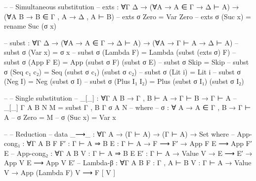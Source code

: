 \documentclass{article}
\begin{document}
\begin{prev}
\begin{code}
-- -- Simultaneous substitution
-- exts : ∀{Γ Δ} → (∀{A} → A ∈ Γ → Δ ⊢ A) → (∀{A B} → B ∈ Γ , A → Δ , A ⊢ B)
-- exts σ Zero = Var Zero
-- exts σ (Suc x) = rename Suc (σ x)

-- subst : ∀{Γ Δ} → (∀{A} → A ∈ Γ → Δ ⊢ A) → (∀{A} → Γ ⊢ A → Δ ⊢ A)
-- subst σ (Var x) = σ x
-- subst σ (Lambda F) = Lambda (subst (exts σ) F)
-- subst σ (App F E) = App (subst σ F) (subst σ E)
-- subst σ Skip = Skip
-- subst σ (Seq c₁ c₂) = Seq (subst σ c₁) (subst σ c₂)
-- subst σ (Lit i) = Lit i
-- subst σ (Neg I) = Neg (subst σ I)
-- subst σ (Plus I₁ I₂) = Plus (subst σ I₁) (subst σ I₂)

-- -- Single substitution
-- _[_] : ∀{Γ A B} → Γ , B ⊢ A → Γ ⊢ B → Γ ⊢ A
-- _[_] {Γ} {A} {B} N M = subst {Γ , B} {Γ} σ {A} N
--     where
--     σ : ∀ {A} → A ∈ Γ , B → Γ ⊢ A
--     σ Zero = M
--     σ (Suc x) = Var x

-- -- Reduction
-- data _⟶_ : ∀{Γ A} → (Γ ⊢ A) → (Γ ⊢ A) → Set where
--     App-cong₁ : ∀{Γ A B} {F F′ : Γ ⊢ A ⇒ B} {E : Γ ⊢ A} → F ⟶ F′ → App F E ⟶ App F′ E
--     App-cong₂ : ∀{Γ A B} {V : Γ ⊢ A ⇒ B} {E E′ : Γ ⊢ A} → Value V → E ⟶ E′ → App V E ⟶ App V E′
--     Lambda-β : ∀{Γ A B} {F : Γ , A ⊢ B} {V : Γ ⊢ A} → Value V → App (Lambda F) V ⟶ F [ V ]
\end{code}
\end{prev}
\end{document}
